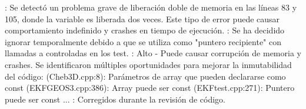 \markdownRendererDocumentBegin
\markdownRendererSectionBegin
{}\markdownRendererInterblockSeparator
{}\markdownRendererSectionBegin
{}\markdownRendererInterblockSeparator
{}\markdownRendererSectionBegin
{}\markdownRendererInterblockSeparator
{}: Se detectó un problema grave de liberación doble de memoria en las líneas 83 y 105, donde la variable  es liberada dos veces. Este tipo de error puede causar comportamiento indefinido y crashes en tiempo de ejecución.\markdownRendererInterblockSeparator
{}\markdownRendererUlBeginTight
\markdownRendererUlItem {}: Se ha decidido ignorar temporalmente debido a que  se utiliza como "puntero recipiente" con llamadas a  controladas en los test.\markdownRendererUlItemEnd 
\markdownRendererUlItem {}: Alto - Puede causar corrupción de memoria y crashes.\markdownRendererUlItemEnd 
\markdownRendererUlEndTight \markdownRendererInterblockSeparator
{}
\markdownRendererSectionEnd \markdownRendererSectionBegin
{}\markdownRendererInterblockSeparator
{}\markdownRendererSectionBegin
{}\markdownRendererInterblockSeparator
{}Se identificaron múltiples oportunidades para mejorar la inmutabilidad del código:\markdownRendererInterblockSeparator
{}\markdownRendererUlBeginTight
\markdownRendererUlItem {} (Cheb3D.cpp:8): Parámetros de array que pueden declararse como const\markdownRendererUlItemEnd 
\markdownRendererUlItem {} (EKF\markdownRendererUnderscore{}GEOS3.cpp:386): Array  puede ser const \markdownRendererUlItemEnd 
\markdownRendererUlItem {} (EKFtest.cpp:271): Puntero  puede ser const\markdownRendererUlItemEnd 
\markdownRendererUlItem ...\markdownRendererUlItemEnd 
\markdownRendererUlEndTight \markdownRendererInterblockSeparator
{}: Corregidos durante la revisión de código.\markdownRendererInterblockSeparator
{}
\markdownRendererSectionEnd \markdownRendererSectionBegin

